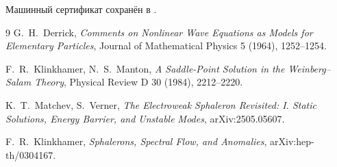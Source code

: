 Машинный сертификат сохранён в
.

\begin{thebibliography}{9}
G.~H.~Derrick,
\emph{Comments on Nonlinear Wave Equations as Models for Elementary
Particles},
Journal of Mathematical Physics 5 (1964), 1252--1254.

F.~R.~Klinkhamer, N.~S.~Manton,
\emph{A Saddle-Point Solution in the Weinberg--Salam Theory},
Physical Review D 30 (1984), 2212--2220.

K.~T.~Matchev, S.~Verner,
\emph{The Electroweak Sphaleron Revisited: I. Static Solutions, Energy
Barrier, and Unstable Modes},
arXiv:2505.05607.

F.~R.~Klinkhamer,
\emph{Sphalerons, Spectral Flow, and Anomalies},
arXiv:hep-th/0304167.
\end{thebibliography}